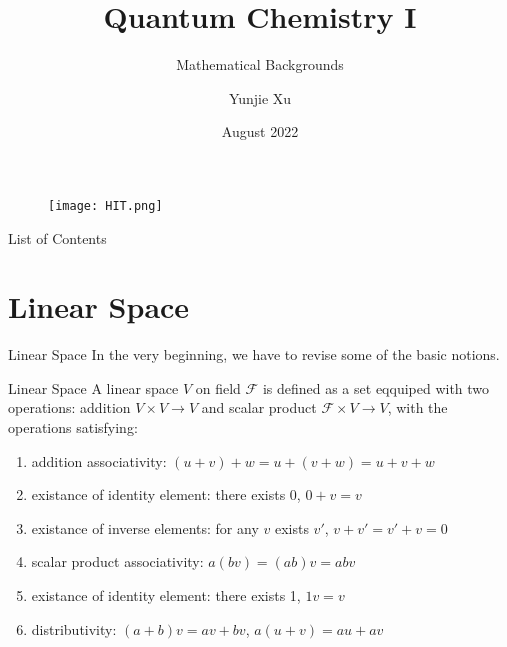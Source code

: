 \documentclass[aspectratio=169,10pt,compress,t]{ctexbeamer}
\begin{document}
\title[QC1]{Quantum Chemistry I}
\subtitle{Mathematical Backgrounds}

\author[XYJ]{Yunjie Xu}
\date[2022.08]{August 2022}

\begin{frame}[plain]
  \begin{figure}[h]
    \texttt{[image: HIT.png]}
    \centering
  \end{figure}
  \titlepage
\end{frame}

\begin{frame}{List of Contents}
  \tableofcontents[hideallsubsections]
\end{frame}


\section{Linear Space}
\begin{frame}{Linear Space}
In the very beginning, we have to revise some of the basic notions.

\begin{block}{Linear Space}
    A linear space $V$ on field $\mathcal{F}$ is defined as a set eqquiped with two operations:
    addition $V×V→V$ and scalar product $\mathcal{F}×V→V$, with the operations satisfying:
    \begin{enumerate}
      \item addition associativity: $(u+v)+w=u+(v+w)=u+v+w$
      \item existance of identity element: there exists 0, $0+v=v$
      \item existance of inverse elements: for any $v$ exists $v'$, $v+v'=v'+v=0$
      \item scalar product associativity: $a(bv) = (ab)v = abv$
      \item existance of identity element: there exists 1, $1v=v$
      \item distributivity: $(a+b)v = av+ bv$, $a(u+v) = au+ av$
    \end{enumerate}
\end{block}  
\end{frame}
\end{document}
